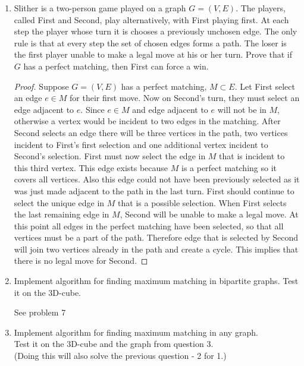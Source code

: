 \documentclass[11pt, oneside]{article}
\begin{document}
\begin{enumerate}
  \item %
    Slither is a two-person game played on a graph $G=(V,E)$. 
    The players, called First and Second, play alternatively, with First playing first.
    At each step the player whose turn it is chooses a previously unchosen edge.
    The only rule is that at every step the set of chosen edges forms a path.
    The loser is the first player unable to make a legal move at his or her turn.
    Prove that if $G$ has a perfect matching, then First can force a win.

    \begin{proof}
      Suppose $G = (V, E)$ has a perfect matching, $M \subset E$.
      Let First select an edge $e \in M$ for their first move.
      Now on Second's turn, they must select an edge adjacent to $e$.
      Since $e \in M$ and edge adjacent to $e$ will not be in $M$, otherwise
      a vertex would be incident to two edges in the matching.
      After Second selects an edge there will be three vertices in the path,
      two vertices incident to First's first selection and one additional vertex
      incident to Second's selection.
      First must now select the edge in $M$ that is incident to this third vertex.
      This edge exists because $M$ is a perfect matching so it covers all
      vertices.
      Also this edge could not have been previously selected as it was just made
      adjacent to the path in the last turn.
      First should continue to select the unique edge in $M$ that is a possible
      selection.
      When First selects the last remaining edge in $M$, Second will be unable
      to make a legal move.
      At this point all edges in the perfect matching have been selected, so that
      all vertices must be a part of the path.
      Therefore edge that is selected by Second will join two vertices already
      in the path and create a cycle.
      This implies that there is no legal move for Second.
    \end{proof}

  \item %
    Implement algorithm for finding maximum matching in bipartite graphs.
    Test it on the 3D-cube.

    See problem 7

  \item %
    Implement algorithm for finding maximum matching in any graph.\\
    Test it on the 3D-cube and the graph from question 3.\\
    (Doing this will also solve the previous question - 2 for 1.)


\end{enumerate}
\end{document}
